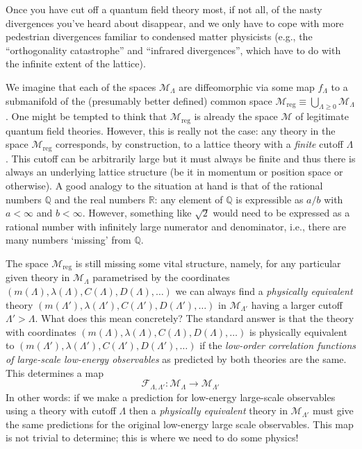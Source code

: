 \documentclass[11pt]{amsart}
\theoremstyle{plain}%
\theoremstyle{definition}
\theoremstyle{remark}
\begin{document}
Once you have cut off a quantum field theory most, if not all, of the nasty divergences you've heard about disappear, and we only have to cope with more pedestrian divergences familiar to condensed matter physicists (e.g., the ``orthogonality catastrophe'' and ``infrared divergences'', which have to do with the infinite extent of the lattice). 

We imagine that each of the spaces $\mathcal{M}_\Lambda$ are diffeomorphic via some map $f_\Lambda$ to a submanifold of the (presumably better defined) common space $\mathcal{M}_{\text{reg}} \equiv \bigcup_{\Lambda \ge 0} \mathcal{M}_{\Lambda}$. One might be tempted to think that $\mathcal{M}_{\text{reg}}$ is already the space $\mathcal{M}$ of legitimate quantum field theories. However, this is really not the case: any theory in the space $\mathcal{M}_{\text{reg}}$ corresponds, by construction, to a lattice theory with a \emph{finite} cutoff $\Lambda$. This cutoff can be arbitrarily large but it must always be finite and thus there is always an underlying lattice structure (be it in momentum or position space or otherwise). A good analogy to the situation at hand is that of the rational numbers $\mathbb{Q}$ and the real numbers $\mathbb{R}$: any element of $\mathbb{Q}$ is expressible as $a/b$ with $a<\infty$ and $b < \infty$. However, something like $\sqrt{2}$ would need to be expressed as a rational number with infinitely large numerator and denominator, i.e., there are many numbers `missing' from $\mathbb{Q}$. 

The space $\mathcal{M}_{\text{reg}}$ is still missing some vital structure, namely, for any particular given theory in $\mathcal{M}_{\Lambda}$ parametrised by the coordinates $(m(\Lambda), \lambda(\Lambda), C(\Lambda), D(\Lambda), \ldots)$ we can always find a \emph{physically equivalent} theory $(m(\Lambda'), \lambda(\Lambda'), C(\Lambda'), D(\Lambda'), \ldots)$ in $\mathcal{M}_{\Lambda'}$ having a larger cutoff $\Lambda' > \Lambda$. What does this mean concretely? The standard answer is that the theory with coordinates $(m(\Lambda), \lambda(\Lambda), C(\Lambda), D(\Lambda), \ldots)$ is physically equivalent to $(m(\Lambda'), \lambda(\Lambda'), C(\Lambda'), D(\Lambda'), \ldots)$ if the \emph{low-order correlation functions of large-scale low-energy observables} as predicted by both theories are the same. This determines a map
\begin{equation}
	\mathcal{F}_{\Lambda,\Lambda'}: \mathcal{M}_\Lambda \rightarrow \mathcal{M}_{\Lambda'}
\end{equation}
In other words: if we make a prediction for low-energy large-scale observables using a theory with cutoff $\Lambda$ then a \emph{physically equivalent} theory in $\mathcal{M}_{\Lambda'}$ must give the same predictions for the original low-energy large scale observables. This map is not trivial to determine; this is where we need to do some physics! 
\end{document}
